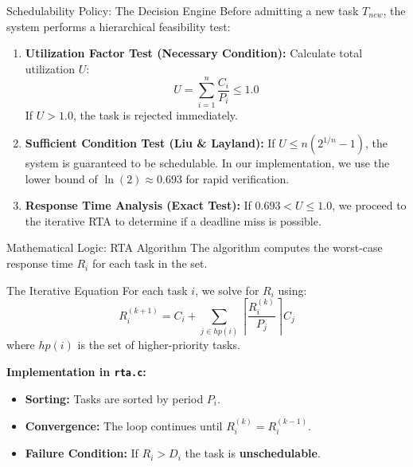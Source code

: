 \begin{frame}{Schedulability Policy: The Decision Engine}
    Before admitting a new task $T_{new}$, the system performs a hierarchical feasibility test:

    \begin{enumerate}
        \item \textbf{Utilization Factor Test (Necessary Condition):}
        Calculate total utilization $U$:
        \[ U = \sum_{i=1}^{n} \frac{C_i}{P_i} \leq 1.0 \]
        If $U > 1.0$, the task is rejected immediately.
        
        \item \textbf{Sufficient Condition Test (Liu \& Layland):}
        If $U \leq n(2^{1/n}-1)$, the system is guaranteed to be schedulable. In our implementation, we use the lower bound of $\ln(2) \approx 0.693$ for rapid verification.
        
        \item \textbf{Response Time Analysis (Exact Test):}
        If $0.693 < U \leq 1.0$, we proceed to the iterative RTA to determine if a deadline miss is possible.
    \end{enumerate}
\end{frame}

\begin{frame}{Mathematical Logic: RTA Algorithm}
    The algorithm computes the worst-case response time $R_i$ for each task in the set.
    
    \begin{block}{The Iterative Equation}
        For each task $i$, we solve for $R_i$ using:
        \[ R_i^{(k+1)} = C_i + \sum_{j \in hp(i)} \left\lceil \frac{R_i^{(k)}}{P_j} \right\rceil C_j \]
        where $hp(i)$ is the set of higher-priority tasks.
    \end{block}

    \textbf{Implementation in \texttt{rta.c}:}
    \begin{itemize}
        \item \textbf{Sorting:} Tasks are sorted by period $P_i$.
        \item \textbf{Convergence:} The loop continues until $R_i^{(k)} = R_i^{(k-1)}$.
        \item \textbf{Failure Condition:} If $R_i > D_i$ the task is \textbf{unschedulable}.
    \end{itemize}
\end{frame}

